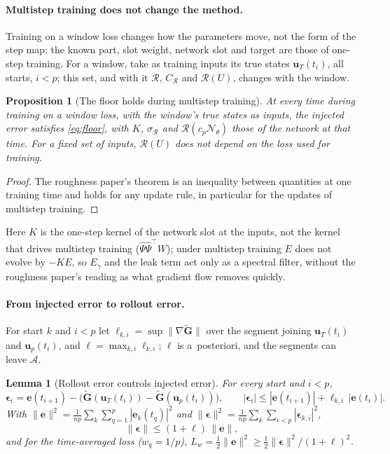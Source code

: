 \documentclass[11pt]{article}
\newtheorem{lemma}{Lemma}
\newtheorem{proposition}{Proposition}
\theoremstyle{definition}
\theoremstyle{remark}
\newcommand{\uu}{\mathbf{u}}
\newcommand{\ee}{\mathbf{e}}
\newcommand{\Gt}{\tilde{\mathbf{G}}}
\newcommand{\eps}{\bm{\epsilon}}
\newcommand{\Rgh}{\mathcal{R}}
\newcommand{\Psih}{\hat\Psi}
\newcommand{\Nn}{\mathcal N_\theta}
\begin{document}
\paragraph{Multistep training does not change the method.}
Training on a window loss changes how the parameters move, not the form of the step map: the known part, slot weight, network slot and target are those of one-step training.
For a window, take as training inputs its true states $\uu_T(t_i)$, all starts, $i<p$; this set, and with it $\Rgh$, $C_\Rgh$ and $\Rgh(U)$, changes with the window.

\begin{proposition}[The floor holds during multistep training]\label{prop:floorms}
At every time during training on a window loss, with the window's true states as inputs, the injected error satisfies \eqref{eq:floor}, with $K$, $\sigma_\Rgh$ and $\Rgh(c_p\Nn)$ those of the network at that time.
For a fixed set of inputs, $\Rgh(U)$ does not depend on the loss used for training.
\end{proposition}

\begin{proof}
The roughness paper's theorem is an inequality between quantities at one training time and holds for any update rule, in particular for the updates of multistep training.
\end{proof}

Here $K$ is the one-step kernel of the network slot at the inputs, not the kernel that drives multistep training ($\Psih\Psih^\top W$); under multistep training $E$ does not evolve by $-KE$, so $E_\gamma$ and the leak term act only as a spectral filter, without the roughness paper's reading as what gradient flow removes quickly.

\paragraph{From injected error to rollout error.}
For start $k$ and $i<p$ let $\ell_{k,i}=\sup\|\nabla\Gt\|$ over the segment joining $\uu_T(t_i)$ and $\uu_p(t_i)$, and $\ell=\max_{k,i}\ell_{k,i}$; $\ell$ is a~posteriori, and the segments can leave $\mathcal A$.

\begin{lemma}[Rollout error controls injected error]\label{lem:inverse}
For every start and $i<p$,
\[
\eps_i=\ee(t_{i+1})-\big(\Gt(\uu_T(t_i))-\Gt(\uu_p(t_i))\big),\qquad |\eps_i|\le|\ee(t_{i+1})|+\ell_{k,i}\,|\ee(t_i)| .
\]
With $\|\ee\|^2=\frac1{np}\sum_k\sum_{q=1}^p|\ee_k(t_q)|^2$ and $\|\eps\|^2=\frac1{np}\sum_k\sum_{i<p}|\eps_{k,i}|^2$,
\begin{equation}\label{eq:inverse}
\|\eps\|\le(1+\ell)\,\|\ee\| ,
\end{equation}
and for the time-averaged loss ($w_q=1/p$), $L_w=\tfrac12\|\ee\|^2\ge\tfrac12\|\eps\|^2/(1+\ell)^2$.
\end{lemma}
\end{document}
